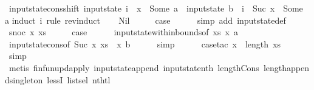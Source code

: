\begin{isabellebody}
{\isafoldproof}%
%
\isadelimproof
\isanewline
%
\endisadelimproof
\isanewline
{}\isamarkupfalse%
\ input{}state{\isacharunderscore}cons{\isacharunderscore}shift{\isacharcolon}\ {\isachardoublequoteopen}input{}state\ i\ {\isachardollar}\ x{}\ {\isacharequal}\ Some\ a\ {\isasymLongrightarrow}\ input{}state\ {\isacharparenleft}b\ {\isacharhash}\ i{\isacharparenright}\ {\isachardollar}\ {\isacharparenleft}Suc\ x{}{\isacharparenright}\ {\isacharequal}\ Some\ a{\isachardoublequoteclose}\isanewline
%
\isadelimproof
%
\endisadelimproof
%
\isatagproof
{}\isamarkupfalse%
{\isacharparenleft}induct\ i\ rule{\isacharcolon}\ rev{\isacharunderscore}induct{\isacharparenright}\isanewline
\ \ \isamarkupfalse%
\ Nil\isanewline
\ \ \isamarkupfalse%
\ \isamarkupfalse%
\ {\isacharquery}case\isanewline
\ \ \ \ \isamarkupfalse%
\ {\isacharparenleft}simp\ add{\isacharcolon}\ input{}state{\isacharunderscore}def{\isacharparenright}\isanewline
{}\isamarkupfalse%
\isanewline
\ \ \isamarkupfalse%
\ {\isacharparenleft}snoc\ x\ xs{\isacharparenright}\isanewline
\ \ \isamarkupfalse%
\ \isamarkupfalse%
\ {\isacharquery}case\isanewline
\ \ \ \ \isamarkupfalse%
\ input{}state{\isacharunderscore}within{\isacharunderscore}bounds{\isacharbrackleft}of\ xs\ x{}\ a{\isacharbrackright}\isanewline
\ \ \ \ \isamarkupfalse%
\ input{}state{\isacharunderscore}cons{\isacharbrackleft}of\ {\isachardoublequoteopen}Suc\ x{}{\isachardoublequoteclose}\ {\isachardoublequoteopen}xs\ {\isacharat}\ {\isacharbrackleft}x{\isacharbrackright}{\isachardoublequoteclose}\ b{\isacharbrackright}\isanewline
\ \ \ \ \isamarkupfalse%
\ simp\isanewline
\ \ \ \ \isamarkupfalse%
\ {\isacharparenleft}case{\isacharunderscore}tac\ {\isachardoublequoteopen}x{}\ {\isacharless}\ length\ xs{\isachardoublequoteclose}{\isacharparenright}\isanewline
\ \ \ \ \ \isamarkupfalse%
\ simp\isanewline
\ \ \ \ \isamarkupfalse%
\ {\isacharparenleft}metis\ finfun{\isacharunderscore}upd{\isacharunderscore}apply\ input{}state{\isacharunderscore}append\ input{}state{\isacharunderscore}nth\ length{\isacharunderscore}Cons\ length{\isacharunderscore}append{\isacharunderscore}singleton\ lessI\ list{\isachardot}sel{\isacharparenleft}{}{\isacharparenright}\ nth{\isacharunderscore}tl{\isacharparenright}\isanewline

\end{isabellebody}
